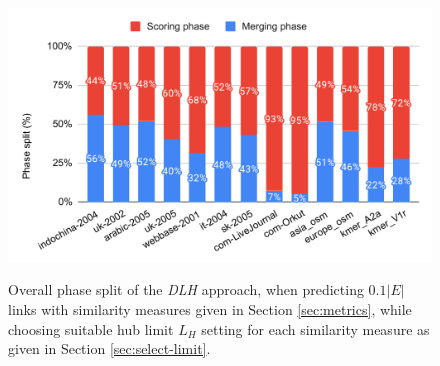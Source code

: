 \begin{figure}[hbtp]
  \centering
  \includegraphics[width=0.98\linewidth]{out/phase-split.pdf} \\[-2ex]
  \caption{Overall phase split of the \textit{DLH} approach, when predicting $0.1|E|$ links with similarity measures given in Section \ref{sec:metrics}, while choosing suitable hub limit $L_H$ setting for each similarity measure as given in Section \ref{sec:select-limit}.}
  \label{fig:phase-split}
\end{figure}
